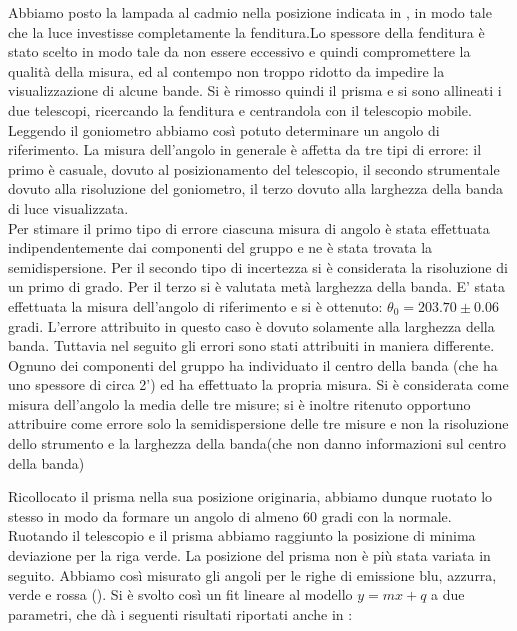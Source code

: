 Abbiamo posto la lampada al cadmio nella posizione indicata in , in modo tale che la luce investisse completamente la fenditura.Lo spessore della fenditura è stato scelto in modo tale da non essere eccessivo e quindi compromettere la qualità della misura, ed al contempo non troppo ridotto da impedire la visualizzazione di alcune bande. \newline
 Si è rimosso quindi il prisma e si sono allineati i due telescopi, ricercando la fenditura e centrandola con il telescopio mobile. Leggendo il goniometro abbiamo così potuto determinare un angolo di riferimento. \newline
  La misura dell'angolo in generale è affetta da tre tipi di errore: il primo è casuale, dovuto al posizionamento del telescopio, il secondo strumentale dovuto alla  risoluzione del goniometro, il terzo dovuto alla larghezza della banda di luce visualizzata. \\
Per stimare il primo tipo di errore ciascuna misura di angolo è stata effettuata indipendentemente dai componenti del gruppo e ne è stata trovata la semidispersione. Per il secondo tipo di incertezza si è considerata la risoluzione di un primo di grado. Per il terzo si è valutata metà larghezza della banda. \newline
 E' stata effettuata la misura dell'angolo di riferimento e si è ottenuto: $\theta_{0}=203.70 \pm 0.06$ gradi. L'errore attribuito in questo caso è dovuto solamente alla larghezza della banda. Tuttavia nel seguito gli errori sono stati attribuiti in maniera differente. Ognuno dei componenti del gruppo ha individuato il centro della banda (che ha uno spessore di circa 2') ed ha effettuato la propria misura. Si è  considerata come misura dell'angolo la media delle tre misure; si è inoltre ritenuto opportuno attribuire come errore solo la semidispersione delle tre misure e non la risoluzione dello strumento e la larghezza della banda(che non danno informazioni sul centro della banda)  \newline
 
Ricollocato il prisma nella sua posizione originaria, abbiamo dunque ruotato lo stesso in modo da formare un angolo di almeno 60 gradi con la normale. Ruotando il telescopio e il prisma abbiamo raggiunto la posizione di minima deviazione per la riga verde. La posizione del prisma non è più stata variata in seguito. Abbiamo così misurato gli angoli per le righe di emissione blu, azzurra, verde e rossa (). Si è svolto così un fit lineare al modello $y=mx+q$ a due parametri, che dà i seguenti risultati riportati anche in :

